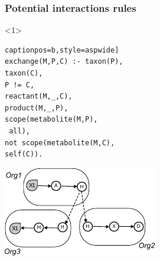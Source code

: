 \documentclass[8pt,usenames,dvipsnames]{beamer}
\begin{document}
%


\begin{frame}[fragile]
\frametitle{Potential interactions rules}
\begin{onlyenv}<1>
\begin{minipage}{0.5\textwidth}
\begin{lstlisting}[mathescape=True, label={lst:echange}] captionpos=b,style=aspwide]
exchange(M,P,C) :- taxon(P),
taxon(C),
P != C,
reactant(M,_,C),
product(M,_,P),
scope(metabolite(M,P),
 all),
not scope(metabolite(M,C), 
self(C)).
\end{lstlisting}
\end{minipage}%
\hspace{0.25cm}
\hfill
\begin{minipage}{0.45\textwidth}
\includegraphics[width=\textwidth]{figures/exchanged.pdf}

\end{minipage}
\end{onlyenv}
\end{frame}
\end{document}
